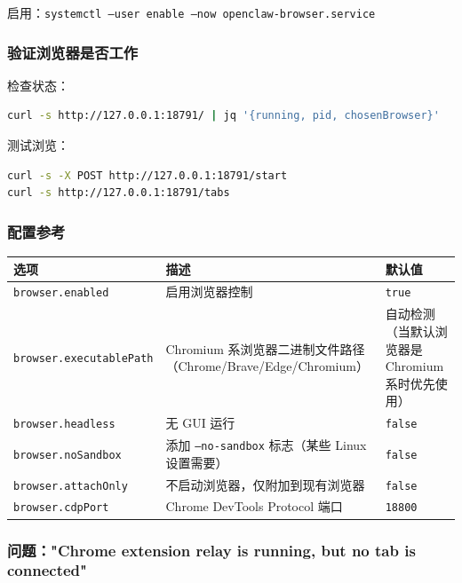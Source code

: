 启用：\texttt{systemctl --user enable --now openclaw-browser.service}

\subsubsection{验证浏览器是否工作}


检查状态：

\begin{lstlisting}[language=bash]
curl -s http://127.0.0.1:18791/ | jq '{running, pid, chosenBrowser}'
\end{lstlisting}


测试浏览：

\begin{lstlisting}[language=bash]
curl -s -X POST http://127.0.0.1:18791/start
curl -s http://127.0.0.1:18791/tabs
\end{lstlisting}


\subsubsection{配置参考}



\begin{table}[h]
\centering
\small
\begin{tabular}{|l|l|l|}
\hline
选项 & 描述 & 默认值 \\
\hline
\texttt{browser.enabled} & 启用浏览器控制 & \texttt{true} \\
\hline
\texttt{browser.executablePath} & Chromium 系浏览器二进制文件路径（Chrome/Brave/Edge/Chromium） & 自动检测（当默认浏览器是 Chromium 系时优先使用） \\
\hline
\texttt{browser.headless} & 无 GUI 运行 & \texttt{false} \\
\hline
\texttt{browser.noSandbox} & 添加 \texttt{--no-sandbox} 标志（某些 Linux 设置需要） & \texttt{false} \\
\hline
\texttt{browser.attachOnly} & 不启动浏览器，仅附加到现有浏览器 & \texttt{false} \\
\hline
\texttt{browser.cdpPort} & Chrome DevTools Protocol 端口 & \texttt{18800} \\
\hline
\end{tabular}
\end{table}



\subsubsection{问题："Chrome extension relay is running, but no tab is connected"}


